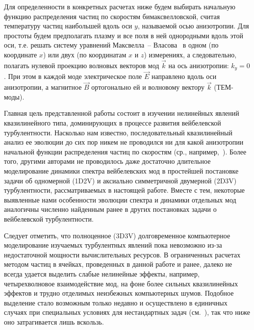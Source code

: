 Для определенности в конкретных расчетах ниже будем выбирать начальную функцию распределения частиц по скоростям бимаксвелловской, считая температуру частиц наибольшей вдоль оси $y$, называемой осью анизотропии. Для простоты будем предполагать плазму и все поля в ней однородными вдоль этой оси, т.е. решать систему уравнений Максвелла~-- Власова~\cite{Baumjohann2012} в одном (по координате $x$) или двух (по координатам $x$ и $z$) измерениях, а следовательно, полагать нулевой проекцию волновых векторов мод $\vec{k}$ на ось анизотропии: $k_y=0$. При этом в каждой моде электрическое поле $\vec{E}$ направлено вдоль оси анизотропии, а магнитное $\vec{B}$ ортогонально ей и волновому вектору $\vec{k}$ (ТЕМ-моды). 

Главная цель представленной работы состоит в изучении нелинейных явлений квазилинейного типа, доминирующих в процессе развития вейбелевской турбулентности. Насколько нам известно, последовательный квазилинейный анализ ее эволюции до сих пор никем не проводился ни для какой анизотропии начальной функции распределения частиц по скоростям (ср., например,~\cite{Ruyer2015,Pokhotelov2011,Davidson1972}). Более того, другими авторами не проводилось даже достаточно длительное моделирование динамики спектра вейбелевских мод в простейшей постановке задачи об одномерной (1D2V) и аксиально симметричной двумерной (2D3V) турбулентности, рассматриваемых в настоящей работе. Вместе с тем, некоторые выявленные нами особенности эволюции спектра и динамики отдельных мод аналогичны численно найденным ранее в других постановках задачи о вейбелевской турбулентности.

Следует отметить, что полноценное (3D3V) долговременное компьютерное моделирование изучаемых турбулентных явлений пока невозможно из-за недостаточной мощности вычислительных ресурсов. В ограниченных расчетах методом частиц в ячейках, проведенных в данной работе и ранее, далеко не всегда удается выделить слабые нелинейные эффекты, например, четырехволновое взаимодействие мод, на фоне более сильных квазилинейных эффектов и трудно отделимых неизбежных компьютерных шумов. Подобное выделение стало возможным только недавно и осуществлено в единичных случаях при специальных условиях для нестандартных задач (см.~\cite{Garasev2018,Garasev2021}), так что ниже оно затрагивается лишь вскользь.

